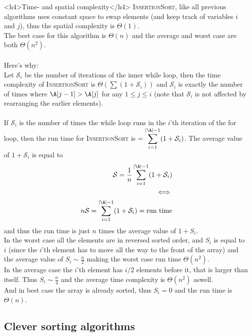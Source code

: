 <h4>Time- and spatial complexity</h4>
\textsc{InsertionSort}, like all previous algorithms uses constant space to swap elements (and keep track of variables $i$ and $j$), 
thus the spatial complexity is $\Theta(1)$.\\
The best case for this algorithm is $\Theta(n)$ and the average and worst case are both $\Theta(n^2)$.
\\\\
Here's why:\\
Let $\mathcal S_i$ be the number of iterations of the inner while loop, then the time complexity of \textsc{InsertionSort}
is $\Theta\left(\sum(1+\mathcal S_i)\right)$ and $\mathcal S_i$ is exactly the number of times where $\A[j - 1]>\A[j]$ for 
any $1\leq j\leq i$ (note that $\mathcal S_i$ is not affected by rearranging the earlier elements). 
\\\\
If $\mathcal S_i$ is the number of times the while loop runs in the $i$'th iteration of the for loop, then the
run time for \textsc{InsertionSort} is $=\displaystyle\sum_{i=1}^{|\A|-1}(1+\mathcal S_i)$. The average value of 
$1+\mathcal S_i$ is equal to
\begin{equation*}
    \begin{split}
        \mathcal S=\frac{1}{n}\sum_{i=1}^{|\A|-1} (1+\mathcal S_i)\\
        \iff\\
        n\mathcal S=\sum_{i=1}^{|\A|-1} (1+\mathcal S_i)=\text{run time}
    \end{split}
\end{equation*}
and thus the run time is just $n$ times the average value of $1+S_i$.\\
In the worst case all the elements are in reversed sorted order, and $S_i$ is equal to $i$ (since the $i$'th element
has to move all the way to the front of the array) and the average value of $S_i\sim\frac{n}{2}$ making the worst case run time
$\Theta(n^2)$.\\
In the average case the $i$'th element has $i/2$ elements before it, that is larger than itself. Thus 
$S_i\sim\frac{n}{4}$ and the average time complexity is $\Theta(n^2)$ aswell.\\
And in best case the array is already sorted, thus $S_i=0$ and the run time is $\Theta(n)$.


\subsection{Clever sorting algorithms}
